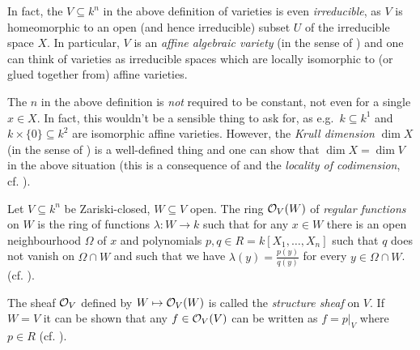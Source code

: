 \documentclass[a4paper,parskip=half,numbers=enddot, DIV=12]{scrreprt}
\begin{document}
	\begin{rem*}
		\begin{alphanumerate}
			\item In fact, the $V\subseteq k^n$ in the above definition of varieties is even \emph{irreducible}, as $V$ is homeomorphic to an open (and hence irreducible) subset $U$ of the irreducible space $X$. In particular, $V$ is an \emph{affine algebraic variety} (in the sense of \cite[Definition~2.2.1]{alg1}) and one can think of varieties as irreducible spaces which are locally isomorphic to (or glued together from) affine varieties.
			\item The $n$ in the above definition is \emph{not} required to be constant, not even for a single $x\in X$. In fact, this wouldn't be a sensible thing to ask for, as e.g.\ $k\subseteq k^1$ and $k\times\{0\}\subseteq k^2$ are isomorphic affine varieties. However, the \emph{Krull dimension} $\dim X$ (in the sense of \cite[Definition~2.1.4]{alg1}) is a well-defined thing and one can show that $\dim X=\dim V$ in the above situation (this is a consequence of \cite[Theorem~6]{alg1} and the \emph{locality of codimension}, cf. \cite[Remark~2.1.3]{alg1}).
		\end{alphanumerate}
	\end{rem*}
	\begin{example}
		    Let $V\subseteq k^n$ be Zariski-closed, $W\subseteq V$ open. The ring $\mathcal{O}_V(W)$ of \emph{regular functions} on $W$ is the ring of functions $\lambda\colon W\to k$ such that for any $x\in W$ there is an open neighbourhood $\Omega$ of $x$ and polynomials $p,q\in R= k[X_1,\ldots,X_n]$ such that $q$ does not vanish on $\Omega\cap W$ and such that we have $\lambda(y) = \frac{p(y)}{q(y)}$ for every $y\in \Omega\cap W$. (cf. \cite[Definition 2.2.2]{alg1}).
		     
		     The sheaf $\mathcal{O}_V$ defined by $W\mapsto \mathcal{O}_V(W)$ is called the \emph{structure sheaf} on $V$. If $W=V$ it can be shown that any $f\in \mathcal{O}_V(V)$ can be written as $f=p|_V$ where $p\in R$ (cf. \cite[Proposition 2.2.2]{alg1}).
	\end{example}
	    
\end{document}
